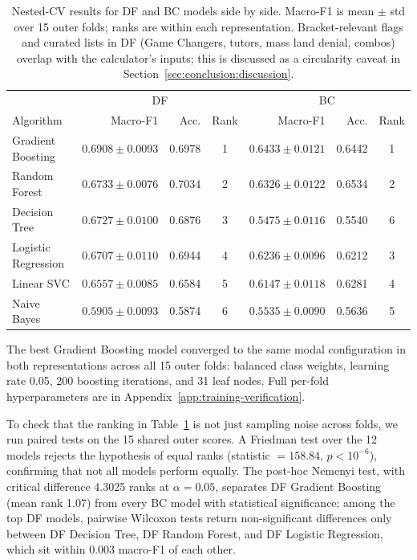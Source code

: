 \documentclass{article}
\begin{document}
\begin{table}[h]
\centering
\caption{Nested-CV results for DF and BC models side by side. Macro-F1 is mean $\pm$ std over 15 outer folds; ranks are within each representation. Bracket-relevant flags and curated lists in DF (Game Changers, tutors, mass land denial, combos) overlap with the calculator's inputs; this is discussed as a circularity caveat in Section~\ref{sec:conclusion:discussion}.}
\label{tab:nested-results}
\small
\setlength{\tabcolsep}{4pt}
\begin{tabular}{l|rrc|rrc}
\toprule
& \multicolumn{3}{c|}{DF} & \multicolumn{3}{c}{BC} \\
Algorithm & Macro-F1 & Acc. & Rank & Macro-F1 & Acc. & Rank \\
\midrule
Gradient Boosting   & \(0.6908 \pm 0.0093\) & 0.6978 & 1 & \(0.6433 \pm 0.0121\) & 0.6442 & 1 \\
Random Forest       & \(0.6733 \pm 0.0076\) & 0.7034 & 2 & \(0.6326 \pm 0.0122\) & 0.6534 & 2 \\
Decision Tree       & \(0.6727 \pm 0.0100\) & 0.6876 & 3 & \(0.5475 \pm 0.0116\) & 0.5540 & 6 \\
Logistic Regression & \(0.6707 \pm 0.0110\) & 0.6944 & 4 & \(0.6236 \pm 0.0096\) & 0.6212 & 3 \\
Linear SVC          & \(0.6557 \pm 0.0085\) & 0.6584 & 5 & \(0.6147 \pm 0.0118\) & 0.6281 & 4 \\
Naive Bayes         & \(0.5905 \pm 0.0093\) & 0.5874 & 6 & \(0.5535 \pm 0.0090\) & 0.5636 & 5 \\
\bottomrule
\end{tabular}
\end{table}

The best Gradient Boosting model converged to the same modal configuration in both representations across all 15 outer folds: balanced class weights, learning rate 0.05, 200 boosting iterations, and 31 leaf nodes. Full per-fold hyperparameters are in Appendix~\ref{app:training-verification}.

To check that the ranking in Table~\ref{tab:nested-results} is not just sampling noise across folds, we run paired tests on the 15 shared outer scores. A Friedman test over the 12 models rejects the hypothesis of equal ranks (statistic \(=158.84\), \(p < 10^{-6}\)), confirming that not all models perform equally. The post-hoc Nemenyi test, with critical difference 4.3025 ranks at \(\alpha=0.05\), separates DF Gradient Boosting (mean rank 1.07) from every BC model with statistical significance; among the top DF models, pairwise Wilcoxon tests return non-significant differences only between DF Decision Tree, DF Random Forest, and DF Logistic Regression, which sit within $0.003$ macro-F1 of each other.
\end{document}
